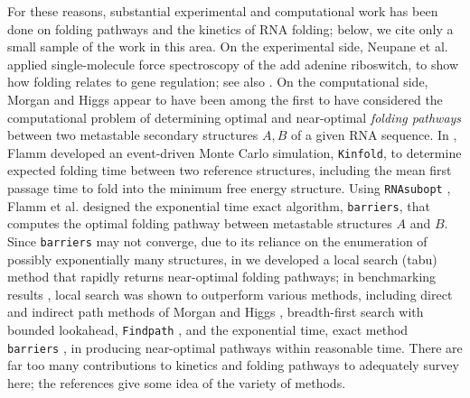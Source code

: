 For these reasons, substantial experimental and computational work
has been done on folding pathways and the kinetics of RNA folding;
below, we cite only a small sample of the work in this area.
On the experimental side,
Neupane et al. \cite{Neupane.nar11} applied single-molecule force spectroscopy
of the add adenine riboswitch, to show how folding  relates to
gene regulation;
see also \cite{Woodside.cocb08,Baird.jacs10,Mitra.r11}.
%
On the computational side, Morgan and Higgs \cite{morganHiggsBarrier}
appear to have been among the first
to have considered the computational problem of determining optimal and
near-optimal {\em folding pathways} between two metastable secondary
structures $A,B$ of a given RNA sequence.  In \cite{flammPhD}, Flamm
developed an event-driven Monte Carlo simulation, {\tt Kinfold},
to determine expected
folding time between two reference structures, including the mean first
passage time to fold into the minimum free energy structure.
Using {\tt RNAsubopt}  \cite{Wuchty.b99}, Flamm et al.
\cite{flamm} designed the exponential
time exact algorithm, {\tt barriers}, that computes the optimal folding
pathway between metastable structures $A$ and $B$. Since {\tt barriers}
may not converge, due to its reliance on the enumeration of possibly
exponentially many structures, in \cite{Dotu.nar10} we developed a
local search (tabu) method that rapidly returns near-optimal folding
pathways; in benchmarking results \cite{Dotu.nar10}, local search was shown
to outperform various methods, including direct and indirect path methods
of Morgan and Higgs \cite{morganHiggsBarrier}, breadth-first search with
bounded lookahead, {\tt Findpath} \cite{Flamm.r01}, and the
exponential time, exact method {\tt barriers} \cite{flamm}, in producing
near-optimal pathways within
reasonable time.
There are far too many contributions to kinetics and folding pathways
to adequately survey here; the references
\cite{Xayaphoummine.nar05,Tang.jmb08,Geis.jmb08,Zhao.bj10,Li.bb12}
give some idea of the variety of methods.

